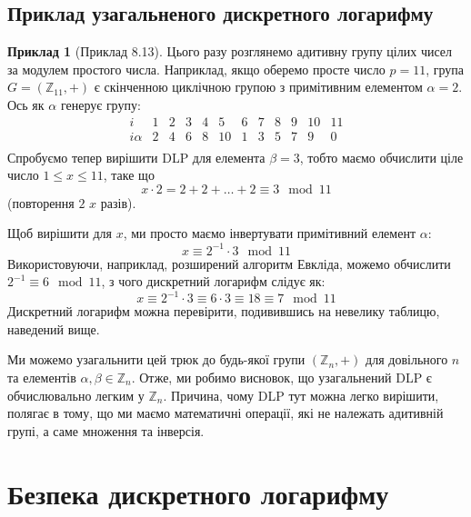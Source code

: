 \documentclass[12pt]{report}
\theoremstyle{definition}
\newtheorem{example}{Приклад}[chapter]
\theoremstyle{plain}
\begin{document}
\subsection{Приклад узагальненого дискретного логарифму}

\begin{example}[Приклад 8.13]
Цього разу розглянемо адитивну групу цілих чисел за модулем простого числа. Наприклад, якщо оберемо просте число \( p = 11 \), група \( G = (\mathbb{Z}_{11}, +) \) є скінченною циклічною групою з примітивним елементом \( \alpha = 2 \). Ось як \( \alpha \) генерує групу:
\[
\begin{array}{c|ccccccccccc}
i & 1 & 2 & 3 & 4 & 5 & 6 & 7 & 8 & 9 & 10 & 11 \\
\hline
i\alpha & 2 & 4 & 6 & 8 & 10 & 1 & 3 & 5 & 7 & 9 & 0 \\
\end{array}
\]
Спробуємо тепер вирішити DLP для елемента \( \beta = 3 \), тобто маємо обчислити ціле число \( 1 \leq x \leq 11 \), таке що
\[
x \cdot 2 = 2 + 2 + \ldots + 2 \equiv 3 \mod 11
\]
(повторення \( 2 \) \( x \) разів).

Щоб вирішити для \( x \), ми просто маємо інвертувати примітивний елемент \( \alpha \):
\[
x \equiv 2^{-1} \cdot 3 \mod 11
\]
Використовуючи, наприклад, розширений алгоритм Евкліда, можемо обчислити \( 2^{-1} \equiv 6 \mod 11 \), з чого дискретний логарифм слідує як:
\[
x \equiv 2^{-1} \cdot 3 \equiv 6 \cdot 3 \equiv 18 \equiv 7 \mod 11
\]
Дискретний логарифм можна перевірити, подивившись на невелику таблицю, наведений вище.
\end{example}

Ми можемо узагальнити цей трюк до будь-якої групи \( (\mathbb{Z}_n, +) \) для довільного \( n \) та елементів \( \alpha, \beta \in \mathbb{Z}_n \). Отже, ми робимо висновок, що узагальнений DLP є обчислювально легким у \( \mathbb{Z}_n \). Причина, чому DLP тут можна легко вирішити, полягає в тому, що ми маємо математичні операції, які не належать адитивній групі, а саме множення та інверсія.

\section{Безпека дискретного логарифму}
\end{document}

